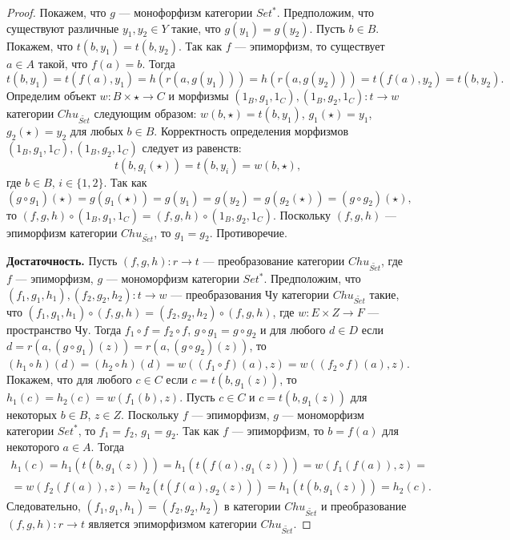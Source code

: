 \documentclass[a4paper,12pt]{article}
\begin{document}
\begin{proof}

    Покажем, что $g$ --- монофорфизм категории $Set^*$. Предположим, что существуют различные $y_1, y_2 \in Y$ такие, что $g(y_1) = g(y_2)$. Пусть $b \in B$. Покажем, что $t(b,y_1) = t(b,y_2)$. Так как $f$ --- эпиморфизм, то существует $a \in A$ такой, что $f(a) = b$. Тогда
    $$
        t(b,y_1) = t(f(a),y_1) = h(r(a,g(y_1))) = h(r(a,g(y_2))) = t(f(a),y_2) = t(b,y_2).
    $$
    Определим объект $w: B \times \star \to C$ и морфизмы $(1_B,g_1,1_C), (1_B,g_2,1_C): t \to w$ категории $Chu_{\widetilde{Set}}$ следующим образом: $w(b,\star) = t(b,y_1)$, $g_1(\star) = y_1$, $g_2(\star) = y_2$ для любых $b \in B$. Корректность определения морфизмов $(1_B,g_1,1_C), (1_B,g_2,1_C)$ следует из равенств:
    $$
        t(b,g_i(\star)) = t(b,y_i) = w(b,\star),
    $$
    где $b \in B$, $i \in \{1,2\}$. Так как
    $$
        (g \circ g_1)(\star) = g(g_1(\star)) = g(y_1) = g(y_2) = g(g_2(\star)) = (g \circ g_2)(\star),
    $$
    то $(f,g,h) \circ (1_B,g_1,1_C) = (f,g,h) \circ (1_B,g_2,1_C)$. Поскольку $(f,g,h)$ --- эпиморфизм категории $Chu_{\widetilde{Set}}$, то $g_1 = g_2$. Противоречие.

    \textbf{Достаточность.} Пусть $(f,g,h): r \to t$ --- преобразование категории $Chu_{\widetilde{Set}}$, где $f$ --- эпиморфизм, $g$ --- мономорфизм категории $Set^*$. Предположим, что $(f_1,g_1,h_1), (f_2,g_2,h_2): t \to w$ --- преобразования Чу категории $Chu_{\widetilde{Set}}$ такие, что $(f_1,g_1,h_1) \circ (f,g,h) = (f_2,g_2,h_2) \circ (f,g,h)$, где $w: E \times Z \to F$ --- пространство Чу. Тогда $f_1 \circ f = f_2 \circ f$, $g \circ g_1 = g \circ g_2$ и для любого $d \in D$ если $d = r(a,(g \circ g_1)(z)) = r(a,(g \circ g_2)(z))$, то $(h_1 \circ h)(d) = (h_2 \circ h)(d) = w((f_1 \circ f)(a), z) = w((f_2 \circ f)(a), z)$. Покажем, что для любого $c \in C$ если $c = t(b,g_1(z))$, то $h_1(c) = h_2(c) = w(f_1(b),z)$. Пусть $c \in C$ и $c = t(b,g_1(z))$ для некоторых $b \in B$, $z \in Z$. Поскольку $f$ --- эпиморфизм, $g$ --- мономорфизм категории $Set^*$, то $f_1 = f_2$, $g_1 = g_2$. Так как $f$ --- эпиморфизм, то $b = f(a)$ для некоторого $a \in A$. Тогда 
    \begin{multline*}
        h_1(c) = h_1(t(b,g_1(z))) = h_1(t(f(a),g_1(z))) = w(f_1(f(a)),z) =\\=
        w(f_2(f(a)),z) = h_2(t(f(a),g_2(z))) = h_1(t(b,g_1(z))) = h_2(c).
    \end{multline*}
    Следовательно, $(f_1,g_1,h_1) = (f_2,g_2,h_2)$ в категории $Chu_{\widetilde{Set}}$ и преобразование $(f,g,h): r \to t$ является эпиморфизмом категории $Chu_{\widetilde{Set}}$.


\end{proof}
\end{document}
